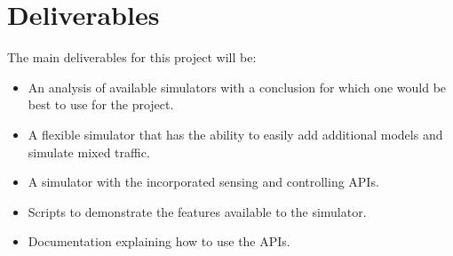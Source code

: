 \section{Deliverables}
The main deliverables for this project will be:
\begin{itemize}
    \item An analysis of available simulators with a conclusion for which one would be best to use for the project.
    \item A flexible simulator that has the ability to easily add additional models and simulate mixed traffic.
    \item A simulator with the incorporated sensing and controlling APIs.
\item Scripts to demonstrate the features available to the simulator. 
\item Documentation explaining how to use the APIs.
\end{itemize}


